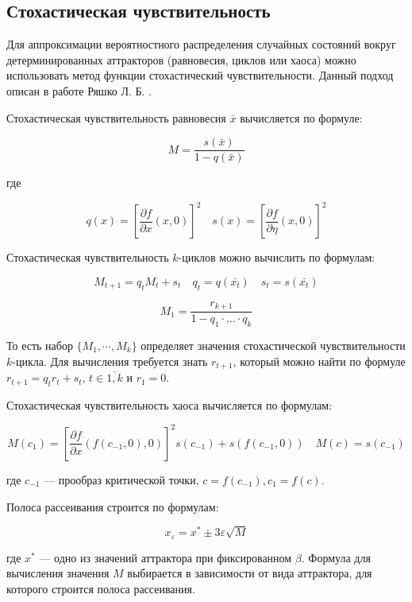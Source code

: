 \subsection{Стохастическая чувствительность}

    Для аппроксимации вероятностного распределения случайных состояний вокруг детерминированных аттракторов (равновесия, циклов или хаоса) можно использовать метод функции стохастический чувствительности. Данный подход описан в работе Ряшко Л. Б. \cite{Ryashko}.

    Стохастическая чувствительность равновесия \(\bar{x}\) вычисляется по формуле:

    \[
        M = \frac{s(\bar{x})}{1 - q(\bar{x})}
    \]

    где 

    \[
        q(x) = \left[\frac{\partial f}{\partial x}(x, 0)\right]^2 \quad s(x) = \left[\frac{\partial f}{\partial \eta}(x, 0)\right]^2
    \]

    Стохастическая чувствительность \(k\)-циклов можно вычислить по формулам:

    \[
        M_{t + 1} = q_t M_t + s_t \quad q_t = q(\bar{x_t}) \quad s_t = s(\bar{x_t})
    \]

    \[
        M_1 = \frac{r_{k + 1}}{1 - q_1 \cdot \ldots \cdot q_k}
    \]

    То есть набор \(\{M_1, \cdots, M_k\}\) определяет значения стохастической чувствительности \(k\)-цикла. Для вычисления требуется знать \(r_{t + 1}\), который можно найти по формуле \(r_{t + 1} = q_t r_t + s_t\), \(t \in \overline{1, k}\) и \(r_1 = 0\).

    Стохастическая чувствительность хаоса вычисляется по формулам:

    \[
        M(c_1) = \left[\frac{\partial f}{\partial x}(f(c_{-1}, 0), 0)\right]^2 s(c_{-1}) + s(f(c_{-1}, 0)) \quad M(c) = s(c_{-1})
    \]

    где \(c_{-1}\) --- прообраз критической точки, \(c = f(c_{-1}), c_1 = f(c)\).

    Полоса рассеивания строится по формулам: 

    \begin{equation}
        \label{scattering_band}
        x_\varepsilon = x^* \pm 3\varepsilon \sqrt{M}        
    \end{equation}

    где \(x^*\) --- одно из значений аттрактора при фиксированном \(\beta\). Формула для вычисления значения \(M\) выбирается в зависимости от вида аттрактора, для которого строится полоса рассеивания.

